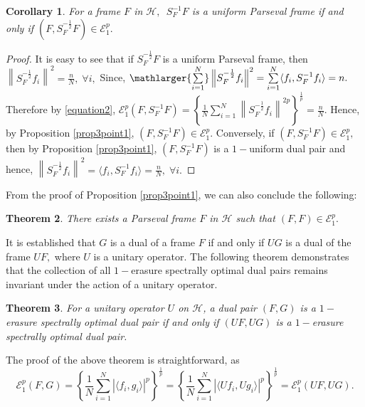 \documentclass[final,1p,times]{elsarticle}
\newtheorem{thm}{Theorem}[section]
\newtheorem{cor}[thm]{Corollary}
\begin{document}
\begin{cor}
		For a frame $F$ in $\mathcal{H},$\, $S_{F}^{-1}F$  is a uniform Parseval frame if and only if \;$\left(F, S_{F}^{-\frac{1}{2}}F\right) \in \mathcal{E}_{1}^p.$
	\end{cor}
\begin{proof}
    It is easy to see that if  $S_{F}^{-\frac{1}{2}}F$  is a uniform Parseval frame, then $\left\| S_{F}^{-\frac{1}{2}}f_i \right\|^2 = \frac{n}{N}, \;\forall i,$ Since, $\mathlarger{\sum\limits_{i=1}^N }\left\|  S_{F}^{-\frac{1}{2}}f_i  \right\|^2 = \sum\limits_{i=1}^N \langle f_i, S_{F}^{-1}f_i \rangle = n. $ Therefore by \eqref{equation2}, $\mathcal{E}_{1}^p (F,S_{F}^{-1}F) = \left\{\frac{1}{N} \sum\limits_{i=1}^N \left\|  S_{F}^{-\frac{1}{2}}f_i  \right\|^{2p}\right\}^{\frac{1}{p}} = \frac{n}{N}. $ Hence, by Proposition \ref{prop3point1}, $(F, S_{F}^{-1}F) \in \mathcal{E}_{1}^p .$ Conversely, if  $(F, S_{F}^{-1}F) \in \mathcal{E}_{1}^p,$ then by Proposition \ref{prop3point1},  $(F, S_{F}^{-1}F)$ is a $1-$uniform dual pair and hence, $\left\|S_{F}^{-\frac{1}{2}}f_i\right\|^2 = \langle f_i, S_{F}^{-1}f_i \rangle = \frac{n}{N}, \;\forall i.$ 
\end{proof}




	
	
	\noindent From the proof of Proposition \ref{prop3point1}, we can also conclude the following:
	
	\begin{thm}\label{thm3point6}
	There exists a Parseval frame $F$ in $\mathcal{H}$ such that $(F,F) \in \mathcal{E}_{1}^p . $ 
	\end{thm}

It is established that $G$ is a dual of a frame $F$ if and only if $UG$ is a dual of the frame $UF,$ where $U$ is a unitary operator. The following theorem demonstrates that the collection of all $1-$erasure spectrally optimal dual pairs remains invariant under the action of a unitary operator.
\begin{thm}\label{thm3point7}
	For a unitary operator $U$ on $\mathcal{H}$, a dual pair $(F,G)$ is a $1-$erasure spectrally optimal dual pair if and only if $(UF,UG)$  is a $1-$erasure spectrally optimal dual pair. 
\end{thm}
\noindent	The proof of the above theorem is straightforward, as
 $$\mathcal{E}_{1}^p (F,G) = \left\{\frac{1}{N} \sum\limits_{i=1}^N \left|\langle f_i, g_i \rangle \right|^p\right\}^{\frac{1}{p}} = \left\{\frac{1}{N} \sum\limits_{i=1}^N \left|\langle Uf_i, Ug_i \rangle \right|^p\right\}^{\frac{1}{p}} = \mathcal{E}_{1}^p (UF,UG) .$$
\end{document}
